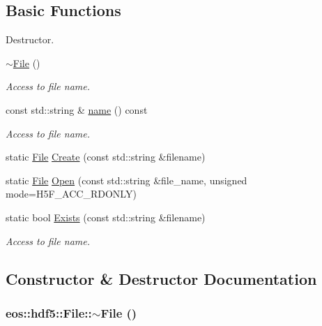 \subsection*{Basic Functions}
\label{_amgrp2386c9a1f1785edee33f374dd2db9b3d}
 Destructor. \begin{DoxyCompactItemize}
\item 
\hyperlink{classeos_1_1hdf5_1_1File_a10a1ab16a4ffa7399f305ae19c26915d}{$\sim$File} ()
\begin{DoxyCompactList}\small\item\em Access to file name. \item\end{DoxyCompactList}\item 
const std::string \& \hyperlink{classeos_1_1hdf5_1_1File_a3ae62d6317e16fab68dc7f345007ca59}{name} () const 
\begin{DoxyCompactList}\small\item\em Access to file name. \item\end{DoxyCompactList}\item 
static \hyperlink{classeos_1_1hdf5_1_1File}{File} \hyperlink{classeos_1_1hdf5_1_1File_ad1d6eb1ed34bc9bf83ce564618e1d346}{Create} (const std::string \&filename)
\item 
static \hyperlink{classeos_1_1hdf5_1_1File}{File} \hyperlink{classeos_1_1hdf5_1_1File_a2db8559898bd4f68d16a56760952c195}{Open} (const std::string \&file\_\-name, unsigned mode=H5F\_\-ACC\_\-RDONLY)
\item 
static bool \hyperlink{classeos_1_1hdf5_1_1File_a907662df69926c556596304405846d7c}{Exists} (const std::string \&filename)
\begin{DoxyCompactList}\small\item\em Access to file name. \item\end{DoxyCompactList}\end{DoxyCompactItemize}


\subsection{Constructor \& Destructor Documentation}
\hypertarget{classeos_1_1hdf5_1_1File_a10a1ab16a4ffa7399f305ae19c26915d}{
\subsubsection[{$\sim$File}]{\setlength{\rightskip}{0pt plus 5cm}eos::hdf5::File::$\sim$File ()}}
\label{classeos_1_1hdf5_1_1File_a10a1ab16a4ffa7399f305ae19c26915d}


